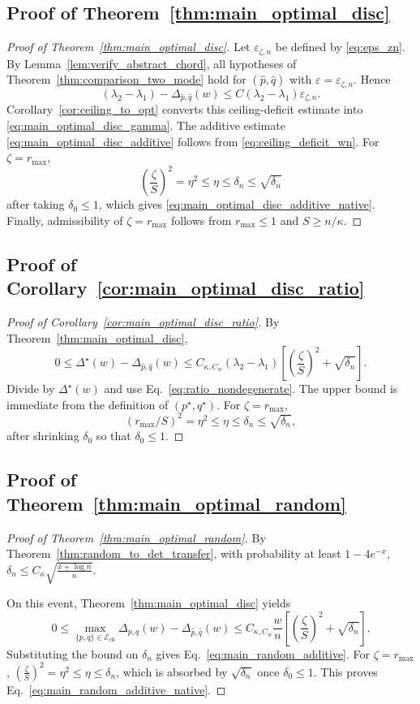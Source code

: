 \documentclass[11pt]{article}
\numberwithin{equation}{section}
\theoremstyle{definition}
\theoremstyle{remark}
\begin{document}
\subsection{Proof of Theorem~\ref{thm:main_optimal_disc}}
\begin{proof}[Proof of Theorem~\ref{thm:main_optimal_disc}]
	Let $\varepsilon_{\zeta,n}$ be defined by \eqref{eq:eps_zn}. By
	Lemma~\ref{lem:verify_abstract_chord}, all hypotheses of
	Theorem~\ref{thm:comparison_two_mode} hold for
	$(\widehat p,\widehat q)$ with
	$\varepsilon=\varepsilon_{\zeta,n}$. Hence
	\[
	(\lambda_2-\lambda_1)-\Delta_{\widehat p,\widehat q}(w)
	\le
	C(\lambda_2-\lambda_1)\varepsilon_{\zeta,n}.
	\]
	Corollary~\ref{cor:ceiling_to_opt} converts this ceiling-deficit estimate
	into \eqref{eq:main_optimal_disc_gamma}. The additive estimate
	\eqref{eq:main_optimal_disc_additive} follows from
	\eqref{eq:ceiling_deficit_wn}. For $\zeta=r_{\max}$,
	\[
	\left(\frac{\zeta}{S}\right)^2=\eta^2\le \eta\le \delta_n\le \sqrt{\delta_n}
	\]
	after taking $\delta_0\le 1$, which gives
	\eqref{eq:main_optimal_disc_additive_native}. Finally, admissibility of
	$\zeta=r_{\max}$ follows from $r_{\max}\le 1$ and $S\ge n/\kappa$.
\end{proof}

\subsection{Proof of Corollary~\ref{cor:main_optimal_disc_ratio}}
\begin{proof}[Proof of Corollary~\ref{cor:main_optimal_disc_ratio}]
	By Theorem~\ref{thm:main_optimal_disc},
	\[
	0\le
	\Delta^\star(w)-\Delta_{\widehat p,\widehat q}(w)
	\le
	C_{\kappa,C_w}(\lambda_2-\lambda_1)
	\left[
	\left(\frac{\zeta}{S}\right)^2+\sqrt{\delta_n}
	\right].
	\]
	Divide by $\Delta^\star(w)$ and use
	Eq.~\eqref{eq:ratio_nondegenerate}. The upper bound is immediate from the
	definition of $(p^\star,q^\star)$. For $\zeta=r_{\max}$,
	\[
	(r_{\max}/S)^2=\eta^2\le \eta\le \delta_n\le \sqrt{\delta_n},
	\]
	after shrinking $\delta_0$ so that $\delta_0\le 1$.
\end{proof}

\subsection{Proof of Theorem~\ref{thm:main_optimal_random}}
\begin{proof}[Proof of Theorem~\ref{thm:main_optimal_random}]
	By Theorem~\ref{thm:random_to_det_transfer}, with probability at least
	$1-4e^{-x}$, $\delta_n\le C_\kappa\sqrt{\frac{x+\log n}{n}}$.
	
	On this event, Theorem~\ref{thm:main_optimal_disc} yields
	\[
	0\le
	\max_{\{p,q\}\in\mathcal{E}_{\mathrm{ch}}}\Delta_{p,q}(w)-\Delta_{\widehat p,\widehat q}(w)
	\le
	C_{\kappa,C_w}\frac{w}{n}
	\left[
	\left(\frac{\zeta}{S}\right)^2+\sqrt{\delta_n}
	\right].
	\]
	Substituting the bound on $\delta_n$ gives
	Eq.~\eqref{eq:main_random_additive}. For $\zeta=r_{\max}$, $\left(\frac{\zeta}{S}\right)^2=\eta^2\le \eta\le \delta_n$, which is absorbed by $\sqrt{\delta_n}$ once $\delta_0\le 1$. This
	proves Eq.~\eqref{eq:main_random_additive_native}.
\end{proof}
\end{document}
